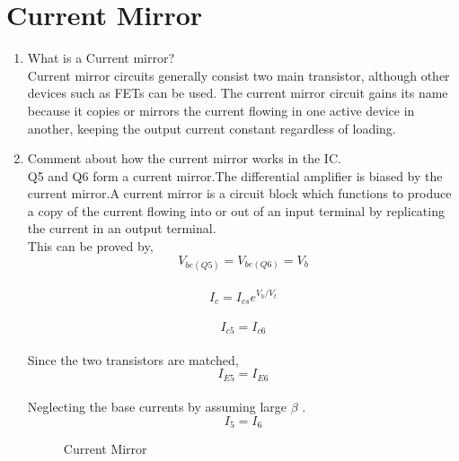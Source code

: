 \documentclass[journal,12pt,twocolumn]{IEEEtran}
\renewcommand\thesection{\arabic{section}}
\begin{document}
\section{Current Mirror}
\begin{enumerate}[label=\thesection.\arabic*,ref=\thesection.\theenumi]
\item What is a Current mirror?\\
\solution Current mirror circuits generally consist two main transistor, although other devices such as FETs can be used. The current mirror circuit gains its name because it copies or mirrors the current flowing in one active device in another, keeping the output current constant regardless of loading.
\item Comment about how the current mirror works in the IC.\\
\solution
Q5 and Q6 form a current mirror.The differential amplifier is biased by the current mirror.A current mirror is a circuit block which functions to produce a copy of the current flowing into or out of an input terminal by replicating the current in an output terminal.\\
This can be proved by,
\bigskip
\vspace{-1em}
$$V_{be(Q5)}=V_{be(Q6)}=V_b$$\\
\vspace{-1em}
$$I_c=I_{cs}e^{V_b/V_t}$$\\
\vspace{-1em}
$$I_{c5}=I_{c6}$$\\
\vspace{-0.5em}
Since the two transistors are matched,\\
\vspace{-1em}
$$I_{E5}=I_{E6}$$\\
\vspace{-0.5em}
Neglecting the base currents by assuming large $\beta$ .\\
\vspace{-1em}
$$I_5=I_6$$

\begin{figure}[!ht]
\centering	
\resizebox{\columnwidth}{!}{}
\caption{Current Mirror}
\label{fig:cmirror}	
\end{figure}


\end{enumerate}
\end{document}
